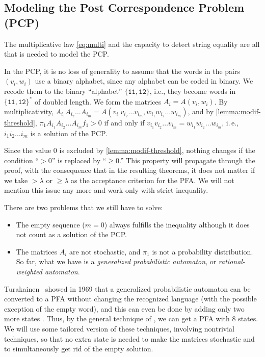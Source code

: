 \documentclass[a4paper,cleveref, autoref, thm-restate]{lipics-v2021}
\begin{document}
\subsection{Modeling the Post Correspondence Problem (PCP)}
\label{sec:PCP}

The multiplicative law
 \eqref{eq:multi}
and the capacity to detect string equality are
all that is needed to model the PCP.

In the PCP,
it is no loss of generality to assume that the words in the pairs $(v_i,w_i)%
\allowbreak
$
use a binary alphabet, since any alphabet can be coded in binary.
We recode them to the binary ``alphabet''
$\{\mathtt{11},\mathtt{12}\}$,
i.e., they become
words
in $\{\mathtt{11},\mathtt{12}\}^*$
of doubled length.
We form the matrices $A_i=A(v_i,w_i)$.
By multiplicativity,
$A_{i_1}A_{i_2} \ldots A_{i_m} =
A(v_{i_1}v_{i_2} \ldots v_{i_m},
w_{i_1}w_{i_2} \ldots w_{i_m})$, and
by 
\autoref{lemma:modif-threshold},
$  \pi_1A_{i_1}A_{i_2} \ldots A_{i_m}f_1 >0$ if and only if
$v_{i_1}v_{i_2} \ldots v_{i_m}=
w_{i_1}w_{i_2} \ldots w_{i_m}$, i.\,e.,
$i_1i_2 \ldots i_m$ is a solution of the PCP.

Since the value 0 is excluded by
\autoref{lemma:modif-threshold},
nothing changes if the condition ``$>0$'' is replaced by
``$\ge 0$.''
This property will propagate through the proof,
with the consequence that in the resulting theorems,
it does not matter if we
take $> \lambda$ or $\ge\lambda$ as the acceptance criterion
for the PFA. We will not mention this issue any more and work
only with strict inequality.


There are two problems that we still have to solve:
\begin{itemize}
\item The empty sequence ($m=0$) always fulfills the inequality
although it does not count as a solution of the PCP.
\item 
The matrices $A_i$ are not stochastic, and $\pi_1$ is not a
probability distribution. So far, what we have is
a \emph{generalized probabilistic automaton}, or
\emph{rational-weighted automaton}.
\end{itemize}
Turakainen~\cite{turakainen69} showed in 
1969 that a
generalized probabilistic automaton can be converted to a PFA without changing the
 recognized language (with the possible exception of the empty word), and
 this can even be done by adding only two more states
\cite[Theorem~1(i)] {Turakainen_1975}.
Thus, by the general technique of 
\cite{Turakainen_1975}, we can get a PFA with 8 states.
We will use some
tailored version of these techniques,
involving nontrivial techniques,
so that no extra state is needed to make the matrices
stochastic and to simultaneously get rid of the empty solution.
\end{document}
